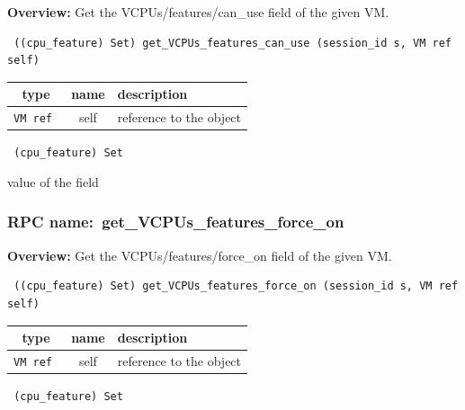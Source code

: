 {\bf Overview:} 
Get the VCPUs/features/can\_use field of the given VM.

\begin{verbatim} ((cpu_feature) Set) get_VCPUs_features_can_use (session_id s, VM ref self)\end{verbatim}



 
\vspace{0.3cm}
\begin{tabular}{|c|c|p{7cm}|}
 \hline
{\bf type} & {\bf name} & {\bf description} \\ \hline
{\tt VM ref } & self & reference to the object \\ \hline 

\end{tabular}

\vspace{0.3cm}

{\tt 
(cpu\_feature) Set
}


value of the field
\vspace{0.3cm}
\vspace{0.3cm}
\vspace{0.3cm}
\subsubsection{RPC name:~get\_VCPUs\_features\_force\_on}

{\bf Overview:} 
Get the VCPUs/features/force\_on field of the given VM.

\begin{verbatim} ((cpu_feature) Set) get_VCPUs_features_force_on (session_id s, VM ref self)\end{verbatim}



 
\vspace{0.3cm}
\begin{tabular}{|c|c|p{7cm}|}
 \hline
{\bf type} & {\bf name} & {\bf description} \\ \hline
{\tt VM ref } & self & reference to the object \\ \hline 

\end{tabular}

\vspace{0.3cm}

{\tt 
(cpu\_feature) Set
}


